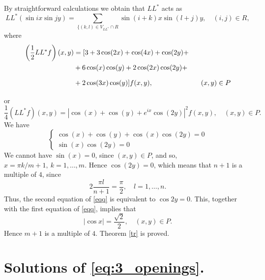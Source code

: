 \documentclass[english,12pt]{article}
\theoremstyle{remark}
\theoremstyle{definition}
\theoremstyle{definition}
\begin{document}
By straightforward calculations we obtain that $LL^*$ acts as
\begin{equation}
  LL^*(\sin ix \sin jy)=
  \sum_{\{(k,l) \in V_{LL^*} \cap R} \sin (i+k)x \sin (l+j)y,
  \quad (i,j) \in R,
\end{equation}
where
\[ \begin{split}
     \left(\frac{1}{2}LL^*f\right)(x,y) & =
     [3+3\cos(2x)+\cos(4x)+\cos(2y)+ \\ &
     +6\cos(x)\cos(y)+2\cos(2x)\cos(2y)+ \\ &
     +2\cos(3x)\cos(y)] f(x,y), \qquad\qquad\qquad\quad (x,y) \in P \vphantom{\bigg|}
   \end{split} \]
or
\[ \frac{1}{4}(LL^*f)(x,y) = \left | \cos(x)+\cos(y)+ e^{ix}\cos(2 y) \right |^2 f(x,y), \quad
   (x,y) \in P. \]
We have
\begin{equation}\label{eqq}
\left \{
\begin{array}{l}
\cos (x) + \cos (y) + \cos (x) \cos(2y)=0 \\
\sin (x) \cos(2 y)=0
\end{array}
\right.
\end{equation}
We cannot have $\sin(x)=0$, since $(x,y) \in P$, and so, $x=\pi k / {m+1},\ k=1,\ldots,m$. Hence
$\cos(2y)=0$, which means that $n+1$ is a multiple of $4$, since
\[ 2\frac{\pi l}{n+1} = \frac{\pi}{2}, \quad l=1,\ldots,n. \]
Thus, the second equation of \eqref{eqq} is equivalent to $\cos 2y=0$. This, together with the
first equation of \eqref{eqq}, implies that
\[ |\cos x|=\frac{\sqrt{2}}{2}, \quad (x,y) \in P. \]
Hence $m+1$ is a multiple of $4.$ Theorem \ref{tr} is proved.

\section{Solutions of \eqref{eq:3_openings}.}
\end{document}
